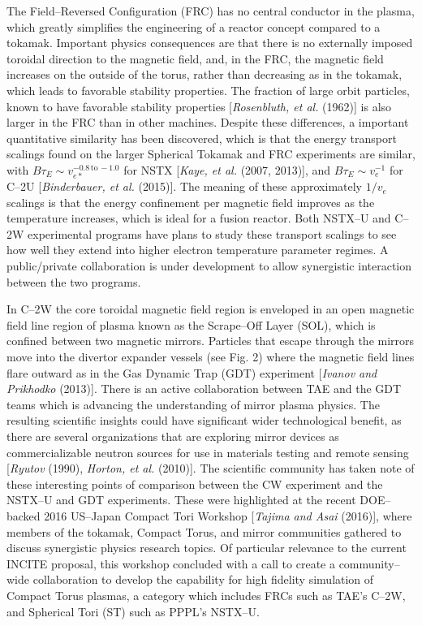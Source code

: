 \documentclass[a4paper,openany,12pt]{book}
\begin{document}
The Field--Reversed Configuration (FRC) has no central conductor in the plasma, which greatly simplifies the engineering of a reactor concept compared to a tokamak. Important physics consequences are that there is no externally imposed toroidal direction to the magnetic field, and, in the FRC, the magnetic field increases on the outside of the torus, rather than decreasing as in the tokamak, which leads to favorable stability properties. The fraction of large orbit particles, known to have favorable stability properties [\emph{Rosenbluth, et al.} (1962)] is also larger in the FRC than in other machines. Despite these differences, a important quantitative similarity has been discovered, which is that the energy transport scalings found on the larger Spherical Tokamak and FRC experiments are similar, with $B\tau_E\sim v_{e*}^{-0.8\,\mbox{to}\,-1.0}$ for NSTX [\emph{Kaye, et al.} (2007, 2013)], and $B\tau_E\sim v_e^{-1}$ for C--2U [\emph{Binderbauer, et al.} (2015)]. The meaning of these approximately $1/v_e$ scalings is that the energy confinement per magnetic field improves as the temperature increases, which is ideal for a fusion reactor. Both NSTX--U and C--2W experimental programs have plans to study these transport scalings to see how well they extend into higher electron temperature parameter regimes. A public/private collaboration is under development to allow synergistic interaction between the two programs.

In C--2W the core toroidal magnetic field region is enveloped in an open magnetic field line region of plasma known as the Scrape--Off Layer (SOL), which is confined between two magnetic mirrors. Particles that escape through the mirrors move into the divertor expander vessels (see Fig. 2) where the magnetic field lines flare outward as in the Gas Dynamic Trap (GDT) experiment [\emph{Ivanov and Prikhodko} (2013)]. There is an active collaboration between TAE and the GDT teams which is advancing the understanding of mirror plasma physics. The resulting scientific insights could have significant wider technological benefit, as there are several organizations that are exploring mirror devices as commercializable neutron sources for use in materials testing and remote sensing [\emph{Ryutov} (1990), \emph{Horton, et al.} (2010)]. The scientific community has taken note of these interesting points of comparison between the CW experiment and the NSTX--U and GDT experiments. These were highlighted at the recent DOE--backed 2016 US--Japan Compact Tori Workshop [\emph{Tajima and Asai} (2016)], where members of the tokamak, Compact Torus, and mirror communities gathered to discuss synergistic physics research topics. Of particular relevance to the current INCITE proposal, this workshop concluded with a call to create a community--wide collaboration to develop the capability for high fidelity simulation of Compact Torus plasmas, a category which includes FRCs such as TAE's C--2W, and Spherical Tori (ST) such as PPPL's NSTX--U.
\end{document}
